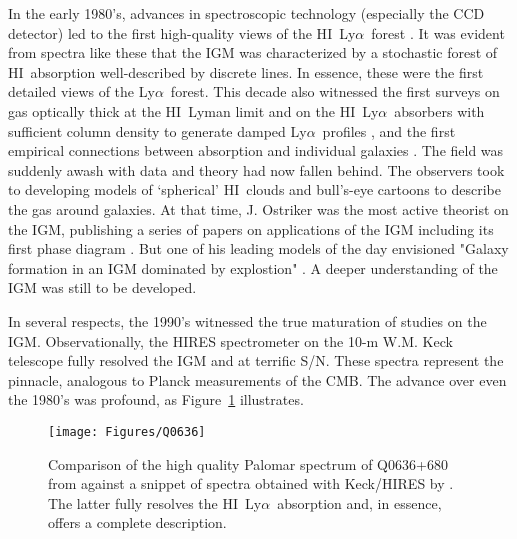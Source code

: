 \documentclass[graybox]{svmult}
\newcommand{\HI}{H{\sc I}}
\def\lya{Ly$\alpha$}
\begin{document}
In the early 1980's, advances in spectroscopic technology
(especially the CCD detector) led to the first high-quality
views of the \HI\ \lya\ forest 
\cite[Figure~\ref{fig:young};][]{young79,boks78,sargent80}.
It was evident from spectra like these that the IGM was
characterized by a stochastic forest of \HI\ absorption
well-described by discrete lines.  
In essence, these were the first detailed views of the
\lya\ forest.
This decade also witnessed the first surveys on gas
optically thick at the \HI\ Lyman limit \cite[aka Lyman Limit Systems 
or LLSs;][]{tytler82}
and on the \HI\ \lya\ absorbers with sufficient column
density to generate damped \lya\ profiles
\cite[aka damped \lya\ systems or DLAs;][]{wolfe86}, and
the first empirical connections between absorption and
individual galaxies \cite[]{bergeron}.
The field was suddenly awash with data and theory had
now fallen behind.
The observers took to developing models of 
`spherical' \HI\ clouds and bull's-eye cartoons to 
describe the gas around galaxies.  
At that time, J. Ostriker was the most active theorist on the IGM,
publishing a series of papers on applications of the
IGM including its first phase diagram 
\cite[]{oi83,oh84,bdo88,duncan89}.
But one of his leading models of the day envisioned
"Galaxy formation in an IGM dominated by explostion"
\cite[]{oc81}.
A deeper understanding of the IGM was still to be
developed.


In several respects, the 1990's witnessed the
true maturation of studies on the IGM.  Observationally,
the HIRES spectrometer \cite{vogt94} on the 10-m W.M.
Keck telescope fully resolved the IGM and at terrific
S/N.  These spectra represent
the pinnacle, analogous to Planck measurements of 
the CMB. The advance over even the 1980's was profound,
as Figure~\ref{fig:HIRES} illustrates.

%
\begin{figure}[b]
\sidecaption
\texttt{[image: Figures/Q0636]}
%
%
\caption{Comparison of the high quality Palomar spectrum
of Q0636+680 from \cite{ssb89} against a snippet of 
spectra obtained with Keck/HIRES by \cite{songaila}.
The latter fully resolves the \HI\ \lya\ absorption
and, in essence, offers a complete description.
}
\label{fig:HIRES}       %
\end{figure}
\end{document}
